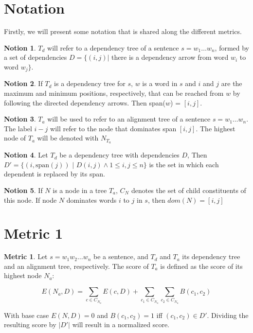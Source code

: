 \documentclass{report}
\theoremstyle{definition}
\newtheorem{metric}{Metric}
\newtheorem{notion}{Notion}
\theoremstyle{plain}
\begin{document}
\section{Notation}

Firstly, we will present some notation that is shared along the different metrics.

\begin{notion}
$T_d$ will refer to a dependency tree of a sentence $s = w_1 \dots w_n$, formed by a set of dependencies $D = \{ (i,j) |$ there is a dependency arrow from word $w_i$ to word $w_j \}$.
\end{notion}

\begin{notion}
If $T_d$ is a dependency tree for $s$, $w$ is a word in $s$ and $i$ and $j$ are the maximum and minimum positions, respectively, that can be reached from $w$ by following the directed dependency arrows. Then span($w$) = $[i,j]$.
\end{notion}

\begin{notion}
$T_a$ will be used to refer to an alignment tree of a sentence $s = w_1 \dots w_n$. The label $i-j$ will refer to the node that dominates span $[i,j]$. The highest node of $T_a$ will be denoted with $N_{T_a}$
\end{notion}

\begin{notion}
Let $T_d$ be a dependency tree with dependencies $D$, Then $D' = \{ (i,\textrm{span}(j))$ $|$ $D(i,j) \land 1 \leq i,j \leq n \}$ is the set in which each dependent is replaced by its span.
\end{notion}

\begin{notion}
If $N$ is a node in a tree $T_a$, $C_N$ denotes the set of child constituents of this node. If node $N$ dominates words $i$ to $j$ in $s$, then $dom(N)= [i,j]$
\end{notion}

\section{Metric 1}

\begin{metric}\label{m1}
Let $s = w_1 w_2 \dots w_n$ be a sentence, and $T_d$ and $T_a$ its dependency tree and an alignment tree, respectively. The score of $T_a$ is defined as the score of its highest node $N_{a}$:

$$
E(N_a,D) = \sum_{c\in C_{N_a}} E(c,D)+ \sum_{c_1\in C_{N_a}} \sum_{c_2\in C_{N_a}} B(c_1,c_2)
$$

\noindent With base case $E(N,D) = 0$ and $B(c_1,c_2) = 1$ iff  $(c_1,c_2)\in D'$. Dividing the resulting score by $|D'|$ will result in a normalized score.
\end{metric}
\end{document}

